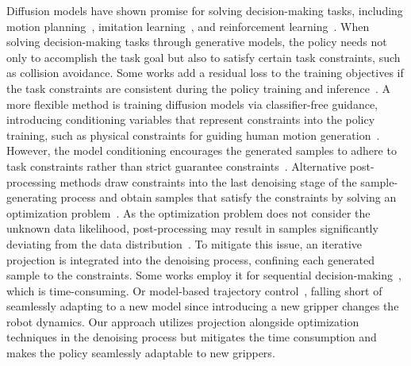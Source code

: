 Diffusion models have shown promise for solving decision-making tasks, including motion planning~\cite{10342382,mizuta2024cobl}, imitation learning~\cite{chi2023diffusion,Ze2024DP3,reuss2023goal}, and reinforcement learning~\cite{liang2023adaptdiffuser,venkatraman2024reasoning}. When solving decision-making tasks through generative models, the policy needs not only to accomplish the task goal but also to satisfy certain task constraints, such as collision avoidance. Some works add a residual loss to the training objectives if the task constraints are consistent during the policy training and inference~\cite{mizuta2024cobl,bastek2024physics}. A more flexible method is training diffusion models via classifier-free guidance\cite{ho2022classifier}, introducing conditioning variables that represent constraints into the policy training, such as physical constraints for guiding human motion generation~\cite{yuan2023physdiff}. However, the model conditioning encourages the generated samples to adhere to task constraints rather than strict guarantee constraints~\cite{christopher2024constrained}. Alternative post-processing methods draw constraints into the last denoising stage of the sample-generating process and obtain samples that satisfy the constraints by solving an optimization problem~\cite{maze2023diffusion,giannone2023aligning}. As the optimization problem does not consider the unknown data likelihood, post-processing may result in samples significantly deviating from the data distribution~\cite{romer2024diffusion}. To mitigate this issue, an iterative projection is integrated into the denoising process, confining each generated sample to the constraints. Some works employ it for sequential decision-making~\cite{christopher2024constrained}, which is time-consuming. Or model-based trajectory control~\cite{romer2024diffusion}, falling short of seamlessly adapting to a new model since introducing a new gripper changes the robot dynamics. Our approach utilizes projection alongside optimization techniques in the denoising process but mitigates the time consumption and makes the policy seamlessly adaptable to new grippers. 
